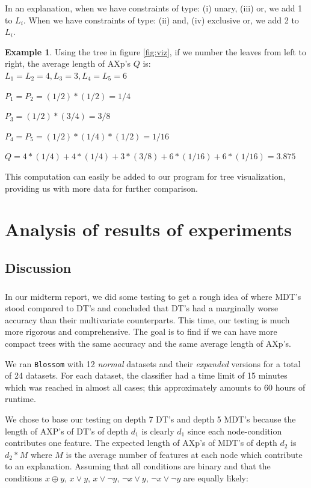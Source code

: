 \documentclass[12pt]{report}
\theoremstyle{definition}
\newtheorem*{example}{Example}
\theoremstyle{definition}
\theoremstyle{definition}
\begin{document}
In an explanation, when we have constraints of type: (i) unary, (iii) or, we add 1 to $L_i$. When we have constraints of type: (ii) and, (iv) exclusive or, we add 2 to $L_i$.

\begin{example}
    Using the tree in figure \ref{fig:viz}, if we number the leaves from left to right, the average length of AXp's $Q$ is:\\
    
    $L_1 = L_2 = 4, L_3 = 3, L_4 = L_5 = 6$
    
    $P_1 = P_2 = (1/2) * (1/2) = 1/4$
    
    $P_3 = (1/2) * (3/4) = 3/8$
    
    $P_4 = P_5 = (1/2) * (1/4) * (1/2) = 1/16$

    $Q = 4 * (1/4) + 4 * (1/4) + 3 * (3/8) + 6 * (1/16) + 6 * (1/16) = 3.875$
\end{example}

This computation can easily be added to our program for tree visualization, providing us with more data for further comparison.



\chapter{Analysis of results of experiments}
\section{Discussion}
\paragraph{} In our midterm report, we did some testing to get a rough idea of where MDT's stood compared to DT's and concluded that DT's had a marginally worse accuracy than their multivariate counterparts. This time, our testing is much more rigorous and comprehensive. The goal is to find if we can have more compact trees with the same accuracy and the same average length of AXp's.

We ran \texttt{Blossom} with 12 \textit{normal} datasets and their \textit{expanded} versions for a total of 24 datasets. For each dataset, the classifier had a time limit of 15 minutes which was reached in almost all cases; this approximately amounts to 60 hours of runtime.

We chose to base our testing on depth 7 DT's and depth 5 MDT's because the length of AXP's of DT's of depth $d_1$ is clearly $d_1$ since each node-condition contributes one feature. The expected length of AXp's of MDT's of depth $d_2$ is $d_2 * M$ where $M$ is the average number of features at each node which contribute to an explanation. Assuming that all conditions are binary and that the conditions $x \oplus y$, $x \lor y$, $x \lor \neg y$, $\neg x \lor y$, $\neg x \lor \neg y$ are equally likely:
\end{document}
